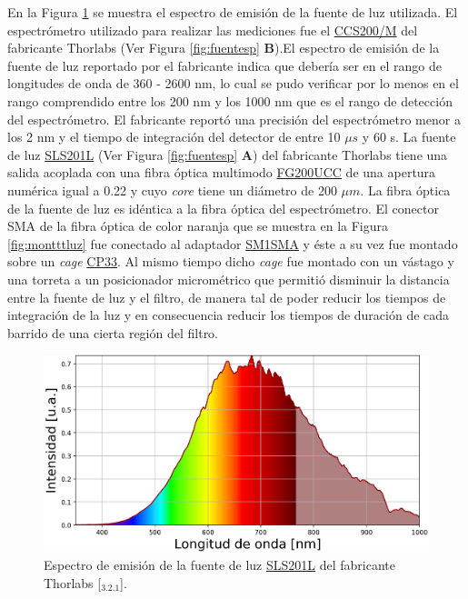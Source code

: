 En la Figura \ref{fig:espfth} se muestra el espectro de emisión de la fuente de luz utilizada.  El espectrómetro utilizado para realizar las mediciones fue el \href{https://www.thorlabs.com/thorproduct.cfm?partnumber=CCS200/M#ad-image-0}{CCS200/M} del fabricante Thorlabs (Ver Figura \ref{fig:fuentesp} \textbf{B}).El espectro de emisión de la fuente de luz reportado por el fabricante indica que debería ser en el rango de longitudes de onda de 360 - 2600 nm, lo cual se pudo verificar por lo menos en el rango comprendido entre los 200 nm y los 1000 nm que es el rango de detección del espectrómetro. El fabricante reportó una precisión del espectrómetro menor a los 2 nm y el tiempo de integración del detector de entre 10 $\mu s$ y 60 s. La fuente de luz \href{https://www.thorlabs.com/newgrouppage9.cfm?objectgroup_id=7269&pn=SLS201L/M}{SLS201L} (Ver Figura \ref{fig:fuentesp} \textbf{A}) del fabricante Thorlabs tiene una salida acoplada con una fibra óptica multimodo \href{https://www.thorlabs.com/newgrouppage9.cfm?objectgroup_id=6839&pn=FG200UCC}{FG200UCC} de una apertura numérica igual a 0.22 y cuyo \textit{core} tiene un diámetro de 200 $\mu m$. La fibra óptica de la fuente de luz es idéntica a la fibra óptica del espectrómetro. El conector SMA de la fibra óptica de color naranja que se muestra en la Figura \ref{fig:montttluz} fue conectado al adaptador \href{https://www.thorlabs.com/thorproduct.cfm?partnumber=SM1SMA\#ad-image-0}{SM1SMA} y éste a su vez fue montado sobre un \textit{cage} \href{https://www.thorlabs.com/thorproduct.cfm?partnumber=CP33}{CP33}. Al mismo tiempo dicho \textit{cage} fue montado con un vástago y una torreta a un posicionador micrométrico que permitió disminuir la distancia entre la fuente de luz y el filtro, de manera tal de poder reducir los tiempos de integración de la luz y en consecuencia reducir los tiempos de duración de cada barrido de una cierta región del filtro.

\begin{figure}[H]
	\centering
	\includegraphics[scale=0.45]{Figs/microespectrometro/espfuentethorl.png}
	\caption{Espectro de emisión de la fuente de luz \href{https://www.thorlabs.com/newgrouppage9.cfm?objectgroup\_id=7269&pn=SLS201L/M}{SLS201L} del fabricante Thorlabs [\href{https://github.com/jrr1984/defects\_analysis/blob/master/light\_sources\_spectrum.py}{\faGithub$_{3.2.1}$}].}
	\label{fig:espfth}
\end{figure}

